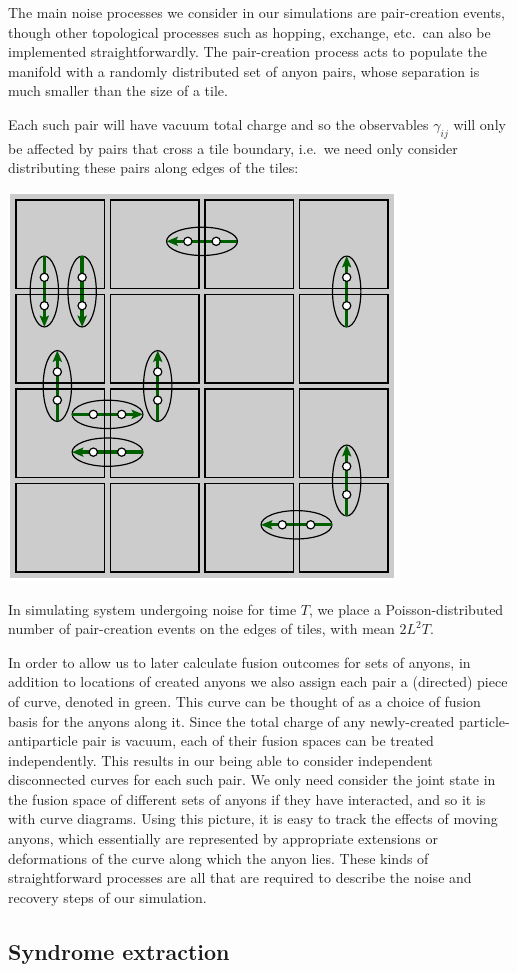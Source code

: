 \documentclass[aps, letterpaper, onecolumn, superscriptaddress, notitlepage, 10pt]{revtex4-1}
\begin{document}
The main noise processes we consider in our simulations are pair-creation events, though other topological processes such as hopping, exchange, etc.~can also be implemented straightforwardly.
The pair-creation process acts to populate the manifold with
a randomly distributed set of anyon pairs,
whose separation is much smaller than the size of a tile.

Each such pair will have vacuum total charge and so the observables
$\gamma_{ij}$ will only be affected by pairs that cross a tile boundary, i.e.~we
need only consider distributing these pairs along edges of the tiles:
\begin{center}
\includegraphics[width=0.3\columnwidth ]{pic-pair-create.pdf}
\end{center}

In simulating system undergoing noise for time $T$, we place a Poisson-distributed number of pair-creation events on the edges of tiles, with mean $2L^2T$.

In order to allow us to later calculate fusion outcomes for sets of anyons, in addition to locations of created anyons we also assign each pair a (directed) piece of curve, denoted in green. This curve can be thought of as a choice of fusion basis for the anyons along it. Since the total charge of any newly-created particle-antiparticle pair is vacuum, each of their fusion spaces can be treated independently. This results in our being able to consider independent disconnected curves for each such pair. We only need consider the joint state in the fusion space of different sets of anyons if they have interacted, and so it is with curve diagrams. Using this picture, it is easy to track the effects of moving anyons, which essentially are represented by appropriate extensions or deformations of the curve along which the anyon lies. These kinds of straightforward processes are all that are required to describe the noise and recovery steps of our simulation.


\subsection{Syndrome extraction}
\end{document}
